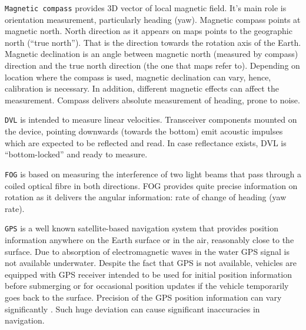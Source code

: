 \documentclass[a4paper, 10pt, conference]{ieeeconf}        %
\newcommand{\T}{\texttt}
\begin{document}
\T{Magnetic compass} provides 3D vector of local magnetic field. It's main role is orientation measurement, particularly heading (yaw). Magnetic compass points at magnetic north. North direction as it appears on maps points to the geographic north (``true north''). That is the direction towards the rotation axis of the Earth. Magnetic declination is an angle between magnetic north (measured by compass) direction and the true north direction (the one that maps refer to). Depending on location where the compass is used, magnetic declination can vary, hence, calibration is necessary. In addition, different magnetic effects can affect the measurement. Compass delivers absolute measurement of heading, prone to noise.

\T{DVL} is intended to measure linear velocities. Transceiver components mounted on the device, pointing downwards (towards the bottom) emit acoustic impulses which are expected to be reflected and read. In case reflectance exists, DVL is  ``bottom-locked'' and ready to measure.
 
\T{FOG} is based on measuring the interference of two light beams that pass through a coiled optical fibre in both directions. FOG provides quite precise information on rotation as it delivers the angular information: rate of change of heading (yaw rate).

\T{GPS} is a well known satellite-based navigation system that provides position information anywhere on the Earth surface or in the air, reasonably close to the surface. Due to absorption of electromagnetic waves in the water GPS signal is not available underwater. Despite the fact that GPS is not available, vehicles are equipped with GPS receiver intended to be used for initial position information before submerging or for occasional position updates if the vehicle temporarily goes back to the surface. Precision of the GPS position information can vary significantly \cite{farrell98}. Such huge deviation can cause significant inaccuracies in navigation.
\end{document}

